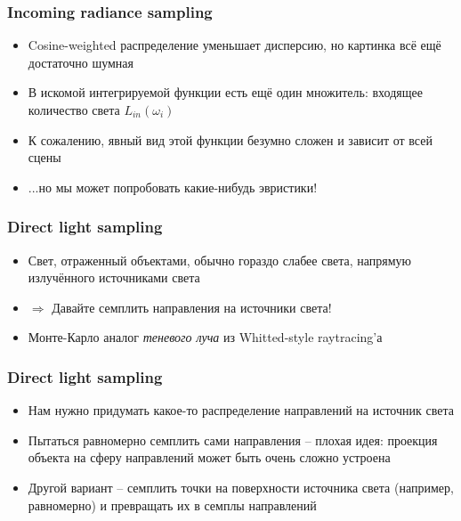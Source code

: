 \documentclass[handout,10pt]{beamer}
\begin{document}
\begin{frame}
\frametitle{Incoming radiance sampling}
\begin{itemize}
\item Cosine-weighted распределение уменьшает дисперсию, но картинка всё ещё достаточно шумная
\pause
\item В искомой интегрируемой функции есть ещё один множитель: входящее количество света \begin{math}L_{in}(\omega_i)\end{math}
\pause
\item К сожалению, явный вид этой функции безумно сложен и зависит от всей сцены
\pause
\item ...но мы может попробовать какие-нибудь эвристики!
\end{itemize}
\end{frame}

\begin{frame}
\frametitle{Direct light sampling}
\begin{itemize}
\item Свет, отраженный объектами, обычно гораздо слабее света, напрямую излучённого источниками света
\pause
\item \begin{math}\Longrightarrow\end{math} Давайте семплить направления на источники света!
\pause
\item Монте-Карло аналог \textit{теневого луча} из Whitted-style raytracing'а
\end{itemize}
\end{frame}

\begin{frame}
\frametitle{Direct light sampling}
\begin{itemize}
\item Нам нужно придумать какое-то распределение направлений на источник света
\pause
\item Пытаться равномерно семплить сами направления -- плохая идея: проекция объекта на сферу направлений может быть очень сложно устроена
\pause
\item Другой вариант -- семплить точки на поверхности источника света (например, равномерно) и превращать их в семплы направлений
\end{itemize}
\end{frame}
\end{document}
